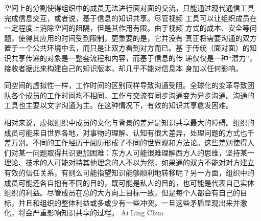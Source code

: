 \documentclass[12pt,a4paper]{ctexart}
\begin{document}
空间上的分割使得组织中的成员无法进行面对面的交流，只能通过现代通信工具
完成信息交互，或者说，基于信息的知识共享\cite{sveiby1996tka}。尽管视频
工具可以让组织成员在一定程度上消除空间的阻隔，但是其作用有限。由于视频
方式的成本、安全等问题，使得其应用的时间受到限制，更重要的是，它并没有
真正将需要沟通的双方置于一个公共环境中去，而只是让双方看到对方而已。基
于传统（面对面）的知识共享传递的对象是一整套流程和内容，而基于信息的传
递仅仅是一种“潜力”，接收者据此来构建自己的知识版本，却几乎不能对信息本
身加以任何影响。

同空间的虚拟性一样，工作时间的区别同样导致沟通受阻。全球化的变革导致团
队各个成员的工作时间均不相同，工作与交流有同步沟通变为异步沟通。沟通的
工具也主要以文字沟通为主。在这种情况下，有效的知识共享愈发困难。

相对来说，虚拟组织中成员的文化与背景的差异是知识共享最大的障碍。组织的
成员可能来自世界各地，对事物的理解、认知有很大差异，处理问题的方式也千
差万别。不同的工作经历于阅历形成了不同的世界观和方法论。这些差别使得人
们对某一问题取得共识更加困难：东方人可能很难理解西方人的思维，坚持某一
理论、技术的人可能对持其他理念的人不以为然，如果通的双方不能对对方建立
有效的信任关系，有则么可能指望知识能够顺利地转移呢？另一方面，组织中的
成员可能还各自抱有不同的目的，既可能是私人的目的，也可能是代表自己实体
组织的利益。尽管成员在总的大方向上目标一致，但是每个人都会有自己的目
标，并且和组织的整体利益或多或少有一些冲突。一旦这些矛盾显现出来并激
化，将会严重影响知识共享的过程。
Ai Ling Chua










\end{document}
